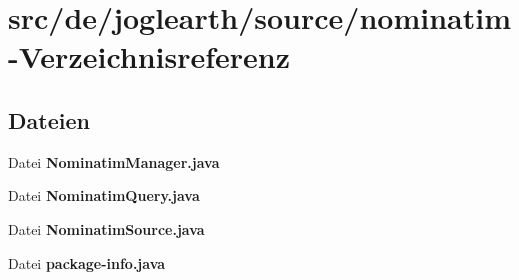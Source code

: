 \section{src/de/joglearth/source/nominatim-\/\-Verzeichnisreferenz}
\label{dir_7b1750de4a291ca68ba612a78f11a07a}
\subsection*{Dateien}
\begin{DoxyCompactItemize}
\item 
Datei {\bfseries Nominatim\-Manager.\-java}
\item 
Datei {\bfseries Nominatim\-Query.\-java}
\item 
Datei {\bfseries Nominatim\-Source.\-java}
\item 
Datei {\bfseries package-\/info.\-java}
\end{DoxyCompactItemize}
